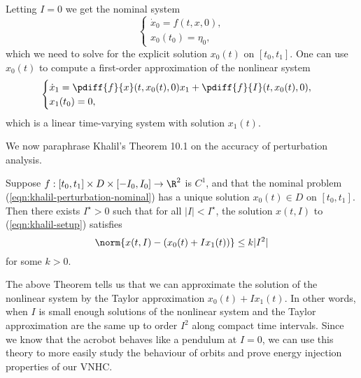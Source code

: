 Letting \(I = 0\) we get the nominal system
\begin{equation}\label{eqn:khalil-perturbation-nominal}
    \begin{cases}
        \dot{x}_0 = f(t,x,0) ,\\
        x_0(t_0) = \eta_0 ,
    \end{cases}
\end{equation}
which we need to solve for the explicit solution \(x_0(t)\) on \([t_0,t_1]\).
One can use \(x_0(t)\) to compute a first-order approximation of
the nonlinear system
\begin{equation}\label{eqn:khalil-perturbation-firstorder}
    \begin{cases}
        \dot{x}_1 = \pdiff{f}{x}(t,x_0(t),0)x_1 + \pdiff{f}{I}(t,x_0(t),0)
        , \\
        x_1(t_0) = 0, \\
    \end{cases}
\end{equation}
which is a linear time-varying system with solution \(x_1(t)\).

We now paraphrase Khalil's Theorem 10.1 \cite{khalil_nonlinear} on the
accuracy of perturbation analysis.
\begin{thm}
    Suppose \(f : [t_0,t_1] \times D \times [-I_0,I_0] \rightarrow \R^2\) is
    \(C^1\), and that the nominal problem (\ref{eqn:khalil-perturbation-nominal}) has a
    unique solution \(x_0(t) \in D\) on \([t_0,t_1]\).
    Then there exists \(I^\star > 0\) such that for all \(|I| < I^\star\), the
    solution \(x(t,I)\) to (\ref{eqn:khalil-setup}) satisfies
    \[
        \norm{x(t,I) - \left(x_0(t) + I x_1(t)\right)} \leq k |I^2|
    \]
    for some \(k > 0\).
\end{thm}

The above Theorem tells us that we can approximate the solution of the nonlinear
system by the Taylor approximation \(x_0(t) + I x_1(t)\).
In other words, when \(I\) is small enough solutions of the nonlinear system and
the Taylor approximation are the same up to order \(I^2\) along compact time
intervals.
Since we know that the acrobot behaves like a pendulum at \(I = 0\), we can
use this theory to more easily study the behaviour of orbits and prove energy
injection properties of our VNHC.
 
